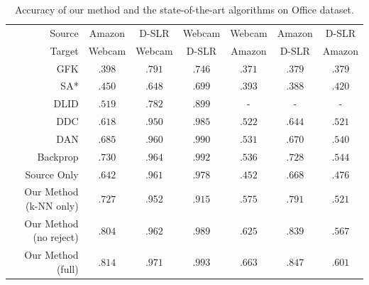 \begin{table}[ht]
\setlength{\tabcolsep}{3pt}
\caption{Accuracy of our method and the state-of-the-art algorithms on Office dataset.}
\vspace{-3mm}
\label{tab:res}
\begin{sc}
\begin{center}
\begin{small}
\begin{tabular}{@{}rcccccc@{}} \toprule 
 Source & Amazon & D-SLR & Webcam & Webcam &Amazon & D-SLR \\
 Target & Webcam & Webcam & D-SLR & Amazon & D-SLR & Amazon \\
 \midrule
GFK \cite{gong2012} & $.398$ & $.791$ & $.746 $ & $.371$ & $.379$ & .379   \\
SA* \cite{fernando13} & $.450$ & $.648$ & $.699$ & $.393$ & $.388$ & $.420$ \\
DLID \cite{chopra13} & $.519$ & $.782$ & $.899$ & -&- &- \\
DDC \cite{tzeng14} & $.618$ & $.950$ & $.985$ & $.522$ & $.644$& $.521$\\
DAN \cite{wang15} & $.685$ & $.960$ & $.990$ & $.531$ & $.670$ & $.540$ \\
Backprop \cite{ganin15} & $.730$ &$.964$ & $.992$ & $.536$ & $.728$ & $.544$\\
\midrule
Source Only & $.642$ & $.961$ & $.978$ & $.452$ & $.668$ & $.476$ \\
Our Method (k-NN only) & $.727$ &.952 & $.915$ & $.575$ & $.791$ & $.521$ \\
Our Method (no reject) & $.804$ &$.962$ & $.989$ & $.625$ & $.839$ & $.567$ \\
Our Method (full) & $\mathbf{.814}$ & $\mathbf{.971}$ & $\mathbf{.993}$ & $\mathbf{.663}$ & $\mathbf{.847}$ & $\mathbf{.601}$ \\
\bottomrule
\end{tabular}%
\end{small}
\end{center}
\end{sc}
\vspace{-2mm}
\end{table}

